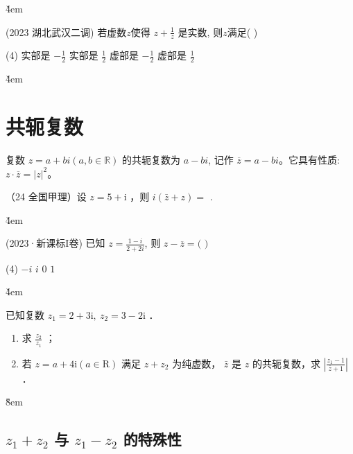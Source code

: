 \v{4em}

\begin{example}(2023 湖北武汉二调)
    若虚数$z$使得 $z+\frac{1}{z}$ 是实数, 则$z$满足( \quad )
    \begin{tasks}(4)
        \task 实部是 $-\frac{1}{2}$
        \task 实部是 $\frac{1}{2}$
        \task 虚部是 $-\frac{1}{2}$
        \task 虚部是 $\frac{1}{2}$
    \end{tasks}
\end{example}

\v{4em}

\section{共轭复数}

\begin{definition}[共轭复数]
    复数 $z=a+bi(a,b\in \mathbb{R})$ 的共轭复数为 $a-bi$, 记作 $\overline{z}=a-bi$。它具有性质: $z\cdot\overline{z}=|z|^{2}$。
\end{definition}

\begin{example}
    （24 全国甲理）设 $z=5+\mathrm{i}$ ，则 $i(\bar{z}+z)=$ \underline{\qquad}.
\end{example}

\v{4em}

\begin{example}(2023·新课标I卷)
    已知 $z=\frac{1-i}{2+2i}$, 则 $z-\overline{z}=($ \quad $)$
    \begin{tasks}(4)
        \task $-i$
        \task $i$
        \task $0$
        \task $1$
    \end{tasks}
\end{example}

\v{4em}

\begin{example}
    已知复数 $z_1=2+3 \mathrm{i}, ~ z_2=3-2 \mathrm{i}$ ．
    \begin{enumerate}
        \item 求 $\frac{z_2}{z_1}$ ；
        \item 若 $z=a+4 \mathrm{i}(a \in \mathrm{R})$ 满足 $z+z_2$ 为纯虚数， $\bar{z}$ 是 $z$ 的共轭复数，求 $\left|\frac{z_1-1}{\bar{z}+1}\right|$ ．
    \end{enumerate}
\end{example}

\v{8em}

\subsection{\texorpdfstring{$z_1 + z_2$ 与 $z_1 - z_2$ 的特殊性}{z1 + z2 and z1 - z2}}

